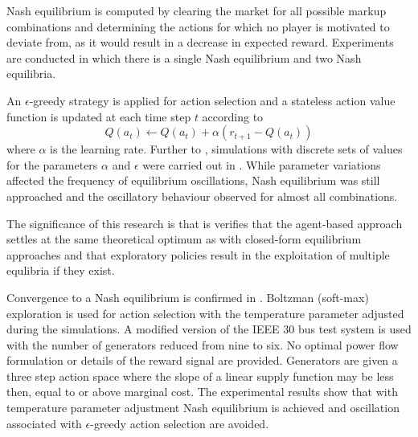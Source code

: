 Nash equilibrium is computed by clearing the market for all possible markup
combinations and determining the actions for which no player is motivated to
deviate from, as it would result in a decrease in expected reward. Experiments
are conducted in which there is a single Nash equilibrium and two
Nash equilibria.

An $\epsilon$-greedy strategy is applied for action selection and a stateless
action value function is updated at each time step $t$ according to
\begin{equation}
Q(a_t) \leftarrow Q(a_t) + \alpha(r_{t+1} - Q(a_t))
\end{equation}
where $\alpha$ is the learning rate.  Further to \cite{krause:nash04},
simulations with discrete sets of values for the parameters $\alpha$ and
$\epsilon$ were carried out in \cite{krause:nash06}.  While parameter
variations affected the frequency of equilibrium oscillations, Nash equilibrium
was still approached and the oscillatory behaviour observed for almost all
combinations.

The significance of this research is that is verifies that the agent-based
approach settles at the same theoretical optimum as with closed-form
equilibrium approaches and that exploratory policies result in the exploitation
of multiple equlibria if they exist.

Convergence to a Nash equilibrium is confirmed in \cite{sistani:06}.  Boltzman
(soft-max) exploration is used for action selection with the temperature
parameter adjusted during the simulations.  A modified version of the IEEE 30
bus test system is used with the number of generators reduced from nine to
six.  No optimal power flow formulation or details of the reward signal are
provided.  Generators are given a three step action space where the slope of a
linear supply function may be less then, equal to or above marginal cost.  The
experimental results show that with temperature parameter adjustment Nash
equilibrium is achieved and oscillation associated with $\epsilon$-greedy
action selection are avoided.

